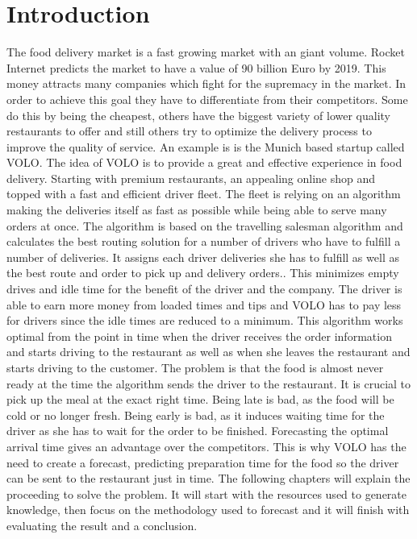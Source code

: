 \chapter{Introduction}\label{chapter:Introduction}

\renewcommand{\thepage}{\arabic{page}}
\setcounter{page}{1}

The food delivery market is a fast growing market with an giant volume. Rocket Internet predicts the market to have a value of 90 billion Euro by 2019. This money attracts many companies which fight for the supremacy in the market. In order to achieve this goal they have to differentiate from their competitors. Some do this by being the cheapest, others have the biggest variety of lower quality restaurants to offer and still others try to optimize the delivery process to improve the quality of service.\newline
An example is is the Munich based startup called VOLO. The idea of VOLO is to provide a great and effective experience in food delivery. Starting with premium restaurants, an appealing online shop and topped with a fast and efficient driver fleet. The fleet is relying on an algorithm making the deliveries itself as fast as possible while being able to serve many orders at once. The algorithm is based on the travelling salesman algorithm and calculates the best routing solution for a number of drivers who have to fulfill a number of deliveries. It assigns each driver deliveries she has to fulfill as well as the best route and order to pick up and delivery orders.. This minimizes empty drives and idle time for the benefit of the driver and the company. The driver is able to earn more money from loaded times and tips and VOLO has to pay less for drivers since the idle times are reduced to a minimum.\newline
This algorithm works optimal from the point in time when the driver receives the order information and starts driving to the restaurant as well as when she leaves the restaurant and starts driving to the customer. The problem is that the food is almost never ready at the time the algorithm sends the driver to the restaurant. It is crucial to pick up the meal at the exact right time. Being late is bad, as the food will be cold or no longer fresh. Being early is bad, as it induces waiting time for the driver as she has to wait for the order to be finished. Forecasting the optimal arrival time gives an advantage over the competitors.\newline
This is why VOLO has the need to create a forecast, predicting preparation time for the food so the driver can be sent to the restaurant just in time.\newline
The following chapters will explain the proceeding to solve the problem. It will start with the resources used to generate knowledge, then focus on the methodology used to forecast and it will finish with evaluating the result and a conclusion.
